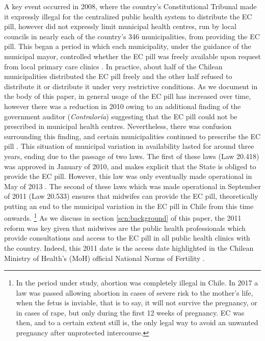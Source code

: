 \documentclass[12pt]{article}
\begin{document}
  
  A key event occurred in 2008, where the country's Constitutional Tribunal made it expressly illegal for the centralized public health system to distribute the EC pill, however did not expressly limit municipal health centres, run by local councils in nearly each of the country's 346 municipalities, from providing the EC pill.  This began a period in which each municipality, under the guidance of the municipal mayor, controlled whether the EC pill was freely available upon request from local primary care clinics \citep{Didesetal2009,Didesetal2010,Didesetal2011}. In practice, about half of the Chilean municipalities distributed the EC pill freely and the other half refused to distribute it or distribute it under very restrictive conditions.  As we document in the body of this paper, in general usage of the EC pill has increased over time, however there was a reduction in 2010 owing to an additional finding of the government auditor (\emph{Contralor\'ia})  suggesting that the EC pill could not be prescribed in municipal health centres. Nevertheless, there was confusion surrounding this finding, and certain municipalities continued to prescribe the EC pill \citep{Didesetal2011}. This situation of municipal variation in availability lasted for around three years, ending due to the passage of two laws.  The first of these laws (Law 20.418) was approved in January of 2010, and makes explicit that the State is obliged to provide the EC pill.  However, this law was only eventually made operational in May of 2013 \citep{NuevoChiqueroPino2019}.  The second of these laws which was made operational in September of 2011 (Law 20.533) ensures that midwifes can provide the EC pill, theoretically putting an end to the municipal variation in the EC pill in Chile from this time onwards.
\footnote{In the period under study, abortion was completely illegal in Chile. In 2017 a law was passed allowing abortion in cases of severe risk to the mother's life, when the fetus is inviable, that is to say, it will not survive the pregnancy, or in cases of rape, but only during the first 12 weeks of pregnancy. EC was then, and to a certain extent still is, the only legal way to avoid an unwanted pregnancy after unprotected intercourse.}  As we discuss in section \ref{scn:background} of this paper, the 2011 reform was key given that midwives are the public health professionals which provide consultations and access to the EC pill in all public health clinics with the country.  Indeed, this 2011 date is the access date highlighted in the Chilean Ministry of Health's (MoH) official National Norms of Fertility \citep[\S A.2]{MinSal2018}.
\end{document}

